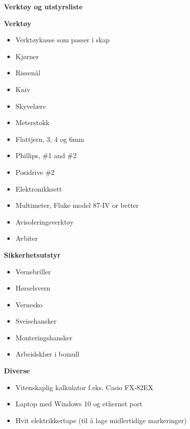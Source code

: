 


\centerline{\bf Verktøy og utstyrsliste }

\vskip 10pt


\noindent
{\bf Verktøy}
\begin{itemize}[itemsep=1mm, parsep=0pt]
	\item Verktøykasse som passer i skap 
	\item Kjørner
	\item Rissenål
	\item Kniv
	\item Skyvelære
	\item Meterstokk
	\item Flattjern, 3, 4 og 6mm
	\item Phillips, \#1 and \#2
	\item Posidrive \#2
	\item Elektronikksett
	\item Multimeter, Fluke model 87-IV or better
	\item Avisoleringsverktøy
	\item Avbiter
\medskip
\end{itemize}
\vskip 10pt

\noindent
{\bf Sikkerhetsutstyr}
\begin{itemize}[itemsep=1mm, parsep=0pt]
	\item Vernebriller
	\item Hørselsvern
	\item Vernesko
	\item Sveisehansker
	\item Monteringshansker
	\item Arbeidsklær i bomull
\medskip
\end{itemize}
\vskip 10pt

\noindent
{\bf Diverse}
\begin{itemize}[itemsep=1mm, parsep=0pt]
	\item Vitenskaplig kalkulator f.eks. Casio FX-82EX
	\item Laptop med Windows 10 og ethernet port
	\item Hvit elektrikkertape (til å lage midlertidige markeringer)
\medskip
\end{itemize}
\vskip 10pt




\vfil

\eject


